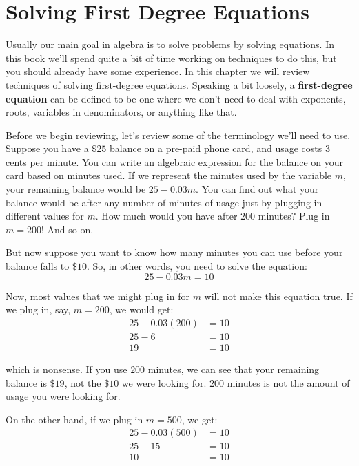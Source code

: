 %
%

\section{Solving First Degree Equations}
\label{FirstDegreeEquations}

Usually our main goal in algebra is to solve problems by solving equations.  In this book we’ll spend quite a bit of time working on techniques to do this, but you should already have some experience.  In this chapter we will review techniques of solving first-degree equations.  Speaking a bit loosely, a \textbf{first-degree equation}  can be defined to be one where we don’t need to deal with exponents, roots, variables in denominators, or anything like that.

Before we begin reviewing, let’s review some of the terminology we’ll need to use.  Suppose you have a $\$25$ balance on a pre-paid phone card, and usage costs $3$ cents per minute. You can write an algebraic expression for the balance on your card based on minutes used.  If we represent the minutes used by the variable $m$, your remaining balance would be $25 - 0.03m$.  You can find out what your balance would be after any number of minutes of usage just by plugging in different values for $m$. How much would you have after $200$ minutes?  Plug in $m = 200$!  And so on.

But now suppose you want to know how many minutes you can use before your balance falls to $\$10$. So, in other words, you need to solve the equation:
$$25 - 0.03m = 10$$

Now, most values that we might plug in for $m$ will not make this equation true.  If we plug in, say, $m = 200$, we would get:
\begin{align*}
	25 - 0.03(200) & = 10 \\
	25 - 6 & = 10 \\
	19 & = 10	
\end{align*}

which is nonsense. If you use $200$ minutes, we can see that your remaining balance is $\$19$, not the $\$10$ we were looking for. $200$ minutes is not the amount of usage you were looking for.

On the other hand, if we plug in $m = 500$, we get:
\begin{align*}
	25 - 0.03(500) & = 10 \\
	25 - 15 & = 10 \\
	10 & = 10
\end{align*}

